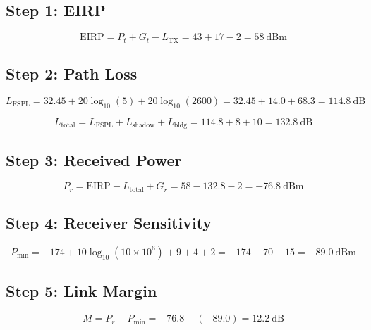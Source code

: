 \subsection*{Step 1: EIRP}

\begin{equation}
\text{EIRP} = P_t + G_t - L_{\text{TX}} = 43 + 17 - 2 = 58~\text{dBm}
\end{equation}

\subsection*{Step 2: Path Loss}

\begin{equation}
L_{\text{FSPL}} = 32.45 + 20\log_{10}(5) + 20\log_{10}(2600) = 32.45 + 14.0 + 68.3 = 114.8~\text{dB}
\end{equation}

\begin{equation}
L_{\text{total}} = L_{\text{FSPL}} + L_{\text{shadow}} + L_{\text{bldg}} = 114.8 + 8 + 10 = 132.8~\text{dB}
\end{equation}

\subsection*{Step 3: Received Power}

\begin{equation}
P_r = \text{EIRP} - L_{\text{total}} + G_r = 58 - 132.8 - 2 = -76.8~\text{dBm}
\end{equation}

\subsection*{Step 4: Receiver Sensitivity}

\begin{equation}
P_{\text{min}} = -174 + 10\log_{10}(10 \times 10^6) + 9 + 4 + 2 = -174 + 70 + 15 = -89.0~\text{dBm}
\end{equation}

\subsection*{Step 5: Link Margin}

\begin{equation}
M = P_r - P_{\text{min}} = -76.8 - (-89.0) = 12.2~\text{dB}
\end{equation}

